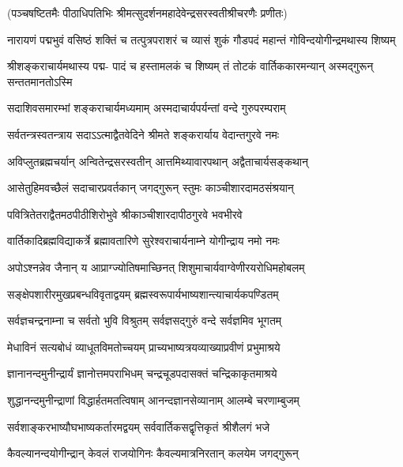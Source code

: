 
(पञ्चषष्टितमैः पीठाधिपतिभिः श्रीमत्सुदर्शनमहादेवेन्द्रसरस्वतीश्रीचरणैः प्रणीतः)

\fourlineindentedshloka
{नारायणं पद्मभुवं वसिष्ठं}
{शक्तिं च तत्पुत्रपराशरं च}
{व्यासं शुकं गौडपदं महान्तं}
{गोविन्दयोगीन्द्रमथास्य शिष्यम्}%

\fourlineindentedshloka
{श्रीशङ्कराचार्यमथास्य पद्म-}
{पादं च हस्तामलकं च शिष्यम्}
{तं तोटकं वार्तिककारमन्यान्}
{अस्मद्गुरून् सन्ततमानतोऽस्मि}%

\twolineshloka
{सदाशिवसमारम्भां शङ्कराचार्यमध्यमाम्}
{अस्मदाचार्यपर्यन्तां वन्दे गुरुपरम्पराम्}%

\twolineshloka
{सर्वतन्त्रस्वतन्त्राय सदाऽऽत्माद्वैतवेदिने}
{श्रीमते शङ्करार्याय वेदान्तगुरवे नमः}%

\twolineshloka
{अविप्लुतब्रह्मचर्यान् अन्वितेन्द्रसरस्वतीन्}
{आत्तमिथ्यावारपथान् अद्वैताचार्यसङ्कथान्}%

\twolineshloka
{आसेतुहिमवच्छैलं सदाचारप्रवर्तकान्}
{जगद्गुरून् स्तुमः काञ्चीशारदामठसंश्रयान्}%

\twolineshloka
{पवित्रितेतराद्वैतमठपीठीशिरोभुवे}
{श्रीकाञ्चीशारदापीठगुरवे भवभीरवे}%

\twolineshloka
{वार्तिकादिब्रह्मविद्याकर्त्रे ब्रह्मावतारिणे}
{सुरेश्वराचार्यनाम्ने योगीन्द्राय नमो नमः}%

\twolineshloka
{अपोऽश्नन्नेव जैनान् य आप्राग्ज्योतिषमाच्छिनत्}
{शिशुमाचार्यवाग्वेणीरयरोधिमहोबलम्}%

\twolineshloka
{सङ्क्षेपशारीरमुखप्रबन्धविवृताद्वयम्}
{ब्रह्मस्वरूपार्यभाष्यशान्त्याचार्यकपण्डितम्}%

\twolineshloka
{सर्वज्ञचन्द्रनाम्ना च सर्वतो भुवि विश्रुतम्}
{सर्वज्ञसद्गुरुं वन्दे सर्वज्ञमिव भूगतम्}%

\twolineshloka
{मेधाविनं सत्यबोधं व्याधूतविमतोच्चयम्}
{प्राच्यभाष्यत्रयव्याख्याप्रवीणं प्रभुमाश्रये}%

\twolineshloka
{ज्ञानानन्दमुनीन्द्रार्यं ज्ञानोत्तमपराभिधम्}
{चन्द्रचूडपदासक्तं चन्द्रिकाकृतमाश्रये}%

\twolineshloka
{शुद्धानन्दमुनीन्द्राणां विद्धार्हतमतत्विषाम्}
{आनन्दज्ञानसेव्यानाम् आलम्बे चरणाम्बुजम्}%

\twolineshloka
{सर्वशाङ्करभाष्यौघभाष्यकर्तारमद्वयम्}
{सर्ववार्तिकसद्वृत्तिकृतं श्रीशैलगं भजे}%

\twolineshloka
{कैवल्यानन्दयोगीन्द्रान् केवलं राजयोगिनः}
{कैवल्यमात्रनिरतान् कलयेम जगद्गुरून्}%

